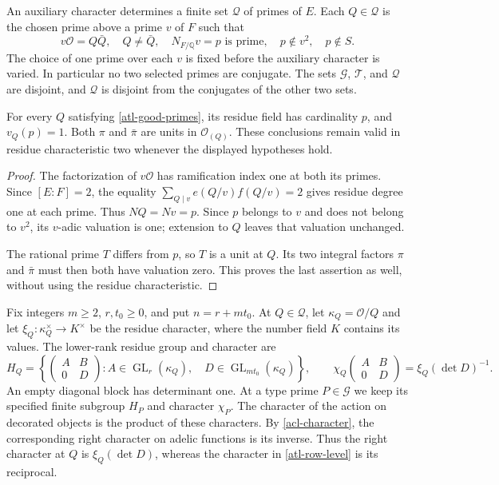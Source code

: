 An auxiliary character determines a finite set $\mathcal Q$
of primes of $E$.  Each $Q\in\mathcal Q$ is the chosen prime
above a prime $v$ of $F$ such that
\begin{equation}\label{atl-good-primes}
 v\mathcal O=Q\bar Q,\quad Q\ne\bar Q,\quad
 N_{F/\mathbb Q}v=p\text{ is prime},\quad
 p\notin v^2,\quad p\notin S.
\end{equation}
The choice of one prime over each $v$ is fixed before the
auxiliary character is varied.  In particular no two selected
primes are conjugate.  The sets $\mathcal G$, $\mathcal T$,
and $\mathcal Q$ are disjoint, and $\mathcal Q$ is disjoint
from the conjugates of the other two sets.

\begin{lemma}\label{atl-prime-units}
For every $Q$ satisfying \eqref{atl-good-primes}, its residue
field has cardinality $p$, and $v_Q(p)=1$.  Both $\pi$ and
$\bar\pi$ are units in $\mathcal O_{(Q)}$.
These conclusions remain valid in residue characteristic two
whenever the displayed hypotheses hold.
\end{lemma}
\begin{proof}
The factorization of $v\mathcal O$ has ramification index one
at both its primes.  Since $[E:F]=2$, the equality
$\sum_{Q\mid v}e(Q/v)f(Q/v)=2$ gives residue degree one
at each prime.  Thus $NQ=Nv=p$.  Since $p$ belongs to $v$
and does not belong to $v^2$, its $v$-adic valuation is one;
extension to $Q$ leaves that valuation unchanged.

The rational prime $T$ differs from $p$, so $T$ is a unit
at $Q$.  Its two integral factors $\pi$ and $\bar\pi$
must then both have valuation zero.  This proves the last
assertion as well, without using the residue characteristic.
\end{proof}

Fix integers $m\geq2$, $r,t_0\geq0$, and put
$n=r+mt_0$.  At $Q\in\mathcal Q$, let
$\kappa_Q=\mathcal O/Q$ and let
$\xi_Q:\kappa_Q^\times\to K^\times$ be the residue
character, where the number field $K$ contains its values.
The lower-rank residue group and character are
\begin{equation}\label{atl-row-level}
 H_Q=\left\{
 \begin{pmatrix}A&B\\0&D\end{pmatrix}:
 A\in\operatorname{GL}_r(\kappa_Q),\quad
 D\in\operatorname{GL}_{mt_0}(\kappa_Q)\right\},
 \qquad
 \chi_Q\begin{pmatrix}A&B\\0&D\end{pmatrix}
                         =\xi_Q(\det D)^{-1}.
\end{equation}
An empty diagonal block has determinant one.  At a type prime
$P\in\mathcal G$ we keep its specified finite subgroup $H_P$
and character $\chi_P$.  The character of the action on
decorated objects is the product of these characters.  By
\eqref{acl-character}, the corresponding right character on
adelic functions is its inverse.  Thus the right character
at $Q$ is $\xi_Q(\det D)$, whereas the character in
\eqref{atl-row-level} is its reciprocal.

